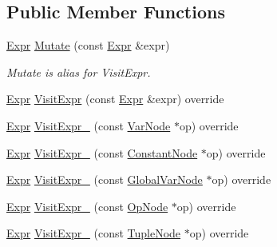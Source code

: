 \subsection*{Public Member Functions}
\begin{DoxyCompactItemize}
\item 
\hyperlink{namespacetvm_1_1relay_a5b84e3790f89bb3fad5c7911eeb99531}{Expr} \hyperlink{classtvm_1_1relay_1_1ExprMutator_ab8d4855c77e09d2274716ca2bbcf0a86}{Mutate} (const \hyperlink{namespacetvm_1_1relay_a5b84e3790f89bb3fad5c7911eeb99531}{Expr} \&expr)
\begin{DoxyCompactList}\small\item\em Mutate is alias for Visit\+Expr. \end{DoxyCompactList}\item 
\hyperlink{namespacetvm_1_1relay_a5b84e3790f89bb3fad5c7911eeb99531}{Expr} \hyperlink{classtvm_1_1relay_1_1ExprMutator_af64fcd37bf18a71a7a5f0eb58a9b9eba}{Visit\+Expr} (const \hyperlink{namespacetvm_1_1relay_a5b84e3790f89bb3fad5c7911eeb99531}{Expr} \&expr) override
\item 
\hyperlink{namespacetvm_1_1relay_a5b84e3790f89bb3fad5c7911eeb99531}{Expr} \hyperlink{classtvm_1_1relay_1_1ExprMutator_ad84a1bcfeb97ec4816579d2363cd76a1}{Visit\+Expr\+\_\+} (const \hyperlink{classtvm_1_1relay_1_1VarNode}{Var\+Node} $\ast$op) override
\item 
\hyperlink{namespacetvm_1_1relay_a5b84e3790f89bb3fad5c7911eeb99531}{Expr} \hyperlink{classtvm_1_1relay_1_1ExprMutator_aa7b993f25c157507d57b9c2718f2621e}{Visit\+Expr\+\_\+} (const \hyperlink{classtvm_1_1relay_1_1ConstantNode}{Constant\+Node} $\ast$op) override
\item 
\hyperlink{namespacetvm_1_1relay_a5b84e3790f89bb3fad5c7911eeb99531}{Expr} \hyperlink{classtvm_1_1relay_1_1ExprMutator_af5e80e31b1e5cc39176f7e9a14c623e6}{Visit\+Expr\+\_\+} (const \hyperlink{namespacetvm_1_1relay_afe7144195dbbc914183189444ef6a347}{Global\+Var\+Node} $\ast$op) override
\item 
\hyperlink{namespacetvm_1_1relay_a5b84e3790f89bb3fad5c7911eeb99531}{Expr} \hyperlink{classtvm_1_1relay_1_1ExprMutator_a07acf48b6c03fdd45f6fee3595358646}{Visit\+Expr\+\_\+} (const \hyperlink{namespacetvm_1_1relay_ac9d4f2cf78a48659817a88d890e1d142}{Op\+Node} $\ast$op) override
\item 
\hyperlink{namespacetvm_1_1relay_a5b84e3790f89bb3fad5c7911eeb99531}{Expr} \hyperlink{classtvm_1_1relay_1_1ExprMutator_a568baaf4dd295369b950e7bcb248e32f}{Visit\+Expr\+\_\+} (const \hyperlink{classtvm_1_1relay_1_1TupleNode}{Tuple\+Node} $\ast$op) override

\end{DoxyCompactItemize}
